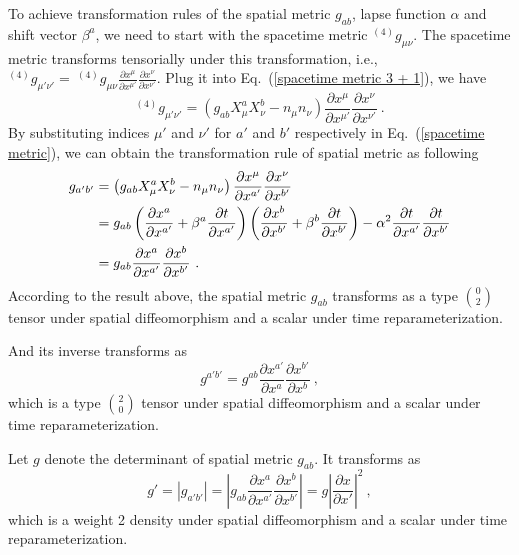 To achieve transformation rules of the spatial metric $g_{ab}$, lapse function $\alpha$ and shift vector $\beta^{a}$, we need to start with the spacetime metric $^{(4)}g_{\mu\nu}$. The spacetime metric transforms tensorially under this transformation, i.e., $^{(4)}g_{\mu' \nu'} =~^{(4)}g_{\mu\nu}\frac{\partial x^{\mu}}{\partial x^{\mu'}}\frac{\partial x^{\nu}}{\partial x^{\nu'}}$. Plug it into Eq.~(\ref{spacetime metric 3 + 1}), we have
\begin{equation}\label{spacetime metric}
^{\left(4\right)}g_{\mu'\nu'} = \left(g_{ab}X^{a}_{\mu}X^{b}_{\nu} - n_{\mu}n_{\nu}\right)\frac{\partial x^{\mu}}{\partial x^{\mu'}}\frac{\partial x^{\nu}}{\partial x^{\nu'}} \ .
\end{equation}
By substituting indices $\mu'$ and $\nu'$ for $a'$ and $b'$ respectively in Eq.~(\ref{spacetime metric}), we can obtain the transformation rule of spatial metric as following
\begin{align}\label{spatialmetric}
g_{a'b'} & = \left(g_{ab}X^{a}_{\mu}X^{b}_{\nu} - n_{\mu}n_{\nu}\right)\frac{\partial x^{\mu}}{\partial x^{a'}}\frac{\partial x^{\nu}}{\partial x^{b'}}\notag\\
&= g_{ab}\left(\frac{\partial x^{a}}{\partial x^{a'}} + \beta^{a}\frac{\partial t}{\partial x^{a'}}\right)\left(\frac{\partial x^{b}}{\partial x^{b'}} + \beta^{b}\frac{\partial t}{\partial x^{b'}}\right) - \alpha^2\frac{\partial t}{\partial x^{a'}}\frac{\partial t}{\partial x^{b'}}\notag\\
& = g_{ab}\frac{\partial x^{a}}{\partial x^{a'}}\frac{\partial x^{b}}{\partial x^{b'}} \ .
\end{align}
According to the result above, the spatial metric $g_{ab}$ transforms as a type $0 \choose 2$ tensor under spatial diffeomorphism and a scalar under time reparameterization.

And its inverse transforms as
\begin{equation}\label{spatialmetricinverse}
g^{a'b'} = g^{ab}\frac{\partial x^{a'}}{\partial x^{a}}\frac{\partial x^{b'}}{\partial x^{b}} \ , 
\end{equation}
which is a type $2 \choose 0$ tensor under spatial diffeomorphism and a scalar under time reparameterization. 

Let $g$ denote the determinant of spatial metric $g_{ab}$. It transforms as
\begin{equation}\label{spatialmetricdet}
g' = \left|g_{a'b'}\right| = \left|g_{ab}\frac{\partial x^{a}}{\partial x^{a'}}\frac{\partial x^{b}}{\partial x^{b'}}\right|  = g\left|\frac{\partial x}{\partial x'}\right|^{2} \ ,
\end{equation}
which is a weight 2 density under spatial diffeomorphism and a scalar under time reparameterization. 

